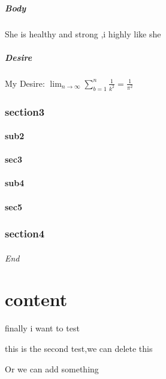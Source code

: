 \documentclass[11pt,a4paper,twoside]{article}
\begin{document}
\subsubsection{Body}
She is healthy and strong ,i highly like she
\subsubsection{Desire}
My Desire:
$
\lim_{n \to \infty}
\sum_{b=1}^{n} \frac{1}{k^2}
=\frac{1}{\pi^2}
$
\section{section3}
\subsection{sub2}
\subsection{sec3}
\subsection{sub4}
\subsection{sec5}
\section{section4}
\paragraph{End}
\part{content}
finally\newpage
i want to test


this is the second test,we can delete this

Or we can add something
\end{document}
